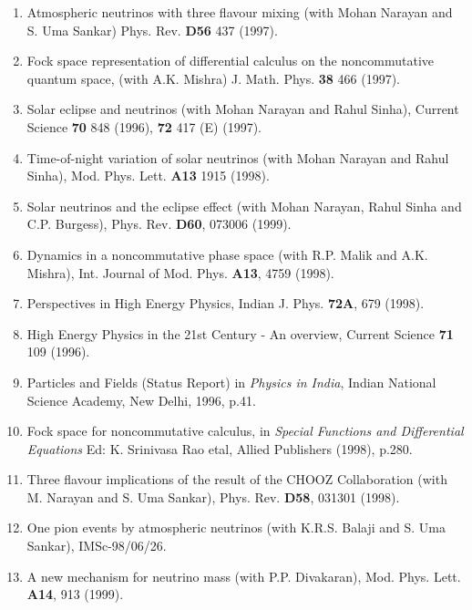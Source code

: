 \begin{enumerate}
\item Atmospheric neutrinos with three flavour mixing (with Mohan
Narayan and S. Uma Sankar) Phys. Rev. {\bf D56} 437 (1997).

\item Fock space representation of differential calculus on the
noncommutative quantum space, (with A.K. Mishra) 
J. Math. Phys. {\bf 38} 466 (1997).

\item Solar eclipse and neutrinos (with Mohan Narayan and Rahul Sinha),
Current Science {\bf 70} 848 (1996), {\bf 72} 417 (E) (1997).

\item Time-of-night variation of solar neutrinos (with Mohan Narayan and
Rahul Sinha), Mod. Phys. Lett. {\bf A13} 1915 (1998).

\item Solar neutrinos and the eclipse effect (with Mohan Narayan,  Rahul
Sinha and C.P. Burgess), Phys. Rev. {\bf D60}, 073006 (1999).

\item Dynamics in a noncommutative phase space (with R.P. Malik and A.K.
Mishra), Int. Journal of Mod. Phys. {\bf A13}, 4759 (1998).

\item Perspectives in High Energy Physics, Indian J. Phys. {\bf 72A},
679 (1998).

\item High Energy Physics in the 21st Century - An overview, Current
Science {\bf 71} 109 (1996).

\item Particles and Fields (Status Report) in {\it {Physics in
India}}, Indian National Science Academy, New Delhi, 1996, p.41.

\item Fock space for noncommutative calculus, in {\it Special Functions
and Differential Equations} Ed: K. Srinivasa Rao etal, Allied Publishers
(1998), p.280.

\item Three flavour implications of the result of the CHOOZ
Collaboration (with M. Narayan and S. Uma Sankar), Phys. Rev. {\bf D58},
031301 (1998).

\item One pion events by atmospheric neutrinos (with K.R.S. Balaji and
S. Uma Sankar), IMSc-98/06/26.

\item A new mechanism for neutrino mass (with P.P. Divakaran), Mod.
Phys. Lett. {\bf A14}, 913 (1999).


\end{enumerate}
